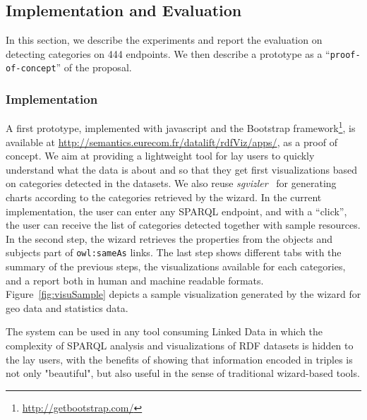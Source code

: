 \subsection{Implementation and Evaluation}
\label{sec:evaluation}
In this section, we describe the experiments and report the evaluation on detecting categories on 444 endpoints. We then describe a prototype as a ``\texttt{proof-of-concept}'' of the proposal.

\subsubsection{Implementation}

A first prototype, implemented with javascript and the Bootstrap framework\footnote{\url{http://getbootstrap.com/}}, is available at \url{http://semantics.eurecom.fr/datalift/rdfViz/apps/}, as a proof of concept. We aim at providing a lightweight tool for lay users to quickly understand what the data is about and so that they get first visualizations based on categories detected in the datasets. We also reuse \textit{sgvizler}~\cite{Martin2012} for generating charts according to the categories retrieved by the wizard. In the current implementation, the user can enter any SPARQL endpoint, and with a ``click'', the user can receive the list of categories detected together with sample resources. In the second step, the wizard retrieves the properties from the objects and subjects part of \texttt{owl:sameAs} links. The last step shows different tabs with the summary of the previous steps, the visualizations available for each categories, and a report both in human and machine readable formats. Figure~\ref{fig:visuSample} depicts a sample visualization generated by the wizard for geo data and statistics data.

The system can be used in any tool consuming Linked Data in which the complexity of SPARQL analysis and visualizations of RDF datasets is hidden to the lay users, with the benefits of showing that information encoded in triples is not only "beautiful", but also useful in the sense of traditional wizard-based tools.


